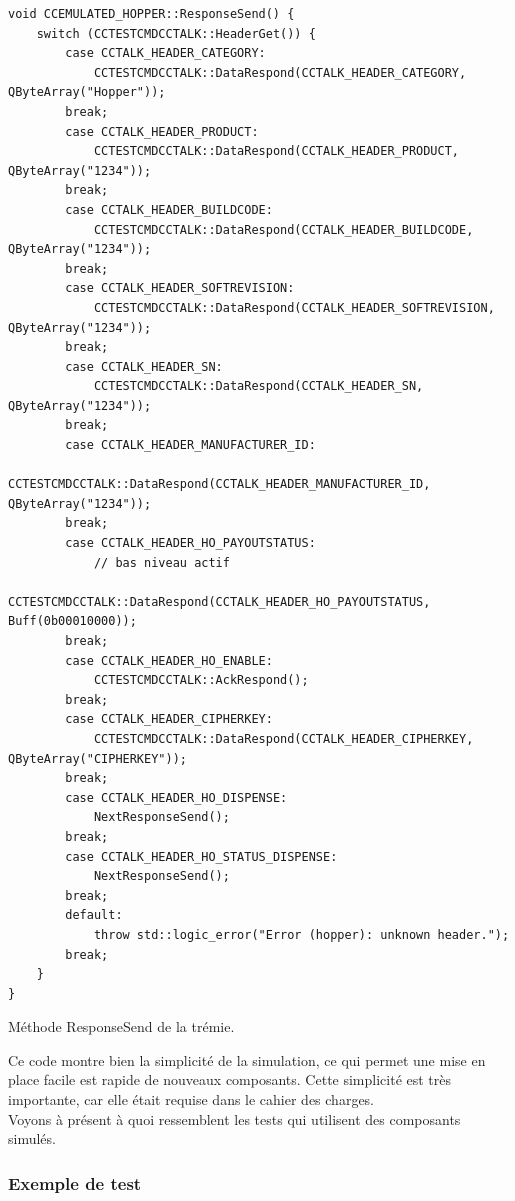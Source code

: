 \documentclass[a4paper]{article}
\begin{document}
\pagebreak
\begin{listing}[ht!]
\begin{verbatim}
void CCEMULATED_HOPPER::ResponseSend() {
    switch (CCTESTCMDCCTALK::HeaderGet()) {
        case CCTALK_HEADER_CATEGORY:
            CCTESTCMDCCTALK::DataRespond(CCTALK_HEADER_CATEGORY, QByteArray("Hopper"));
        break;
        case CCTALK_HEADER_PRODUCT:
            CCTESTCMDCCTALK::DataRespond(CCTALK_HEADER_PRODUCT, QByteArray("1234"));
        break;
        case CCTALK_HEADER_BUILDCODE:
            CCTESTCMDCCTALK::DataRespond(CCTALK_HEADER_BUILDCODE, QByteArray("1234"));
        break;
        case CCTALK_HEADER_SOFTREVISION:
            CCTESTCMDCCTALK::DataRespond(CCTALK_HEADER_SOFTREVISION, QByteArray("1234"));
        break;
        case CCTALK_HEADER_SN:
            CCTESTCMDCCTALK::DataRespond(CCTALK_HEADER_SN, QByteArray("1234"));
        break;
        case CCTALK_HEADER_MANUFACTURER_ID:
            CCTESTCMDCCTALK::DataRespond(CCTALK_HEADER_MANUFACTURER_ID, QByteArray("1234"));
        break;
        case CCTALK_HEADER_HO_PAYOUTSTATUS:
            // bas niveau actif
            CCTESTCMDCCTALK::DataRespond(CCTALK_HEADER_HO_PAYOUTSTATUS, Buff(0b00010000));
        break;
        case CCTALK_HEADER_HO_ENABLE:
            CCTESTCMDCCTALK::AckRespond();
        break;
        case CCTALK_HEADER_CIPHERKEY:
            CCTESTCMDCCTALK::DataRespond(CCTALK_HEADER_CIPHERKEY, QByteArray("CIPHERKEY"));
        break;
        case CCTALK_HEADER_HO_DISPENSE:
            NextResponseSend();
        break;
        case CCTALK_HEADER_HO_STATUS_DISPENSE:
            NextResponseSend();
        break;
        default:
            throw std::logic_error("Error (hopper): unknown header.");
        break;
    }
}
\end{verbatim}
\caption{Méthode ResponseSend de la trémie.}
\label{respsendhopper}
\end{listing}

Ce code montre bien la simplicité de la simulation, ce qui permet une mise en
place facile est rapide de nouveaux composants. Cette simplicité est très
importante, car elle était requise dans le cahier des charges.\\

Voyons à présent à quoi ressemblent les tests qui utilisent des composants
simulés.

\subsubsection{Exemple de test}
\end{document}
